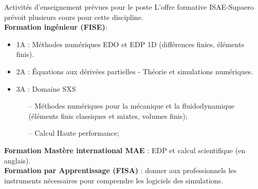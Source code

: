 \documentclass[aspectratio=169, french]{ISAE-Beamer}
\begin{document}
\begin{frame}{Activités d'enseignement prévues pour le poste}
	L'offre formative ISAE-Supaero prévoit plusieurs cours pour cette discipline.\\
	\vspace{.5cm}
\textbf{Formation ingénieur (FISE)}:
\begin{itemize}
\item 1A : Méthodes numériques EDO et EDP 1D (différences finies, éléments finis).
\item 2A : Équations aux dérivées partielles - Théorie et simulations numériques.
\item 3A : Domaine SXS 
\begin{itemize}
	\item[--] Méthodes numériques pour la mécanique et la fluidodynamique (éléments finis classiques et mixtes, volumes finis);
	\item[--] Calcul Haute performance;
\end{itemize}
\end{itemize}
\vspace{.5cm}
\textbf{Formation Mastère international MAE} :  EDP et calcul scientifique (en anglais).\\
\vspace{.5cm}
\textbf{Formation par Apprentissage (FISA)} : donner aux professionnels les instruments nécessaires pour comprendre les logiciels des simulations.
	
\end{frame}
\end{document}
